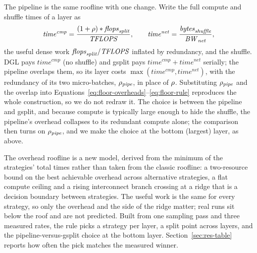 The pipeline is the same roofline with one change.  Write the full compute and shuffle times of a layer as
\begin{equation}
  \mathit{time}^{\mathit{cmp}} = \frac{(1+\rho)\ast \mathit{flops}_{\mathit{split}}}{\mathit{TFLOPS}},\qquad
  \mathit{time}^{\mathit{net}} = \frac{\mathit{bytes}_{\mathit{shuffle}}}{\mathit{BW}_{\mathit{net}}},
  \label{eq:layer-times}
\end{equation}
the useful dense work $\mathit{flops}_{\mathit{split}}/\mathit{TFLOPS}$ inflated by redundancy, and the shuffle. DGL pays
$\mathit{time}^{\mathit{cmp}}$ (no shuffle) and gsplit pays
$\mathit{time}^{\mathit{cmp}}+\mathit{time}^{\mathit{net}}$ serially; the pipeline overlaps them,
so its layer costs $\max(\mathit{time}^{\mathit{cmp}},\mathit{time}^{\mathit{net}})$, with the
redundancy of its two micro-batches, $\rho_{\mathit{pipe}}$, in place of $\rho$. Substituting
$\rho_{\mathit{pipe}}$ and the overlap into Equations~\eqref{eq:floor-overheads}--\eqref{eq:floor-rule}
reproduces the whole construction, so we do not redraw it. The choice is between the pipeline and
gsplit, and because compute is typically large enough to hide the shuffle, the pipeline's overhead
collapses to its redundant compute alone; the comparison then turns on $\rho_{\mathit{pipe}}$, and
we make the choice at the bottom (largest) layer, as above.

The overhead roofline is a new model, derived from the minimum of the strategies' total times rather
than taken from the classic roofline: a two-resource bound on the best achievable overhead across
alternative strategies, a flat compute ceiling and a rising interconnect branch crossing at a ridge
that is a decision boundary between strategies. The useful work is the same for every strategy, so only the overhead and the side
of the ridge matter; real runs sit below the roof and are not predicted. Built from
one sampling pass and three measured rates, the rule picks a strategy per layer, a split point across
layers, and the pipeline-versus-gsplit choice at the bottom layer. Section~\ref{sec:res-table}
reports how often the pick matches the measured winner.
